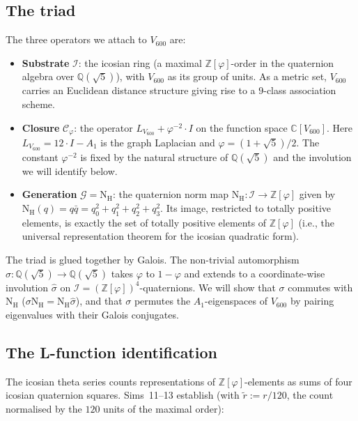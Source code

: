 \documentclass[11pt,a4paper]{article}
\theoremstyle{definition}
\theoremstyle{remark}
\newcommand{\Z}{\mathbb{Z}}
\newcommand{\Q}{\mathbb{Q}}
\newcommand{\C}{\mathbb{C}}
\newcommand{\II}{\mathcal{I}}
\newcommand{\GG}{\mathcal{G}}
\newcommand{\CC}{\mathcal{C}}
\newcommand{\NH}{\mathrm{N}_{\mathrm{H}}}
\newcommand{\Zphi}{\Z[\varphi]}
\begin{document}
\subsection*{The triad}

The three operators we attach to $V_{600}$ are:

\begin{itemize}
\item \textbf{Substrate} $\II$: the icosian ring (a maximal $\Zphi$-order in
the quaternion algebra over $\Q(\sqrt{5})$), with $V_{600}$ as its group of
units. As a metric set, $V_{600}$ carries an Euclidean distance structure
giving rise to a $9$-class association scheme.

\item \textbf{Closure} $\CC_\varphi$: the operator $L_{V_{600}} + \varphi^{-2}\cdot I$
on the function space $\C[V_{600}]$. Here $L_{V_{600}} = 12\!\cdot\! I - A_1$ is
the graph Laplacian and $\varphi = (1+\sqrt 5)/2$. The constant $\varphi^{-2}$ is
fixed by the natural structure of $\Q(\sqrt{5})$ and the involution we will
identify below.

\item \textbf{Generation} $\GG = \NH$: the quaternion norm map
$\NH : \II \to \Zphi$ given by $\NH(q) = q\bar q = q_0^2 + q_1^2 + q_2^2 + q_3^2$.
Its image, restricted to totally positive elements, is exactly the set of
totally positive elements of $\Zphi$ (i.e., the universal representation
theorem for the icosian quadratic form).
\end{itemize}

The triad is glued together by Galois. The non-trivial automorphism
$\sigma : \Q(\sqrt 5) \to \Q(\sqrt 5)$ takes $\varphi$ to $1-\varphi$ and
extends to a coordinate-wise involution $\widehat\sigma$ on
$\II = (\Zphi)^4$-quaternions. We will show that $\sigma$ commutes with
$\NH$ ($\sigma\NH = \NH\widehat\sigma$), and that $\sigma$ permutes the
$A_1$-eigenspaces of $V_{600}$ by pairing eigenvalues with their Galois
conjugates.

\subsection*{The L-function identification}

The icosian theta series counts representations of $\Zphi$-elements as sums of
four icosian quaternion squares. Sims~11--13 establish (with $\widetilde r := r/120$,
the count normalised by the $120$ units of the maximal order):
\end{document}
